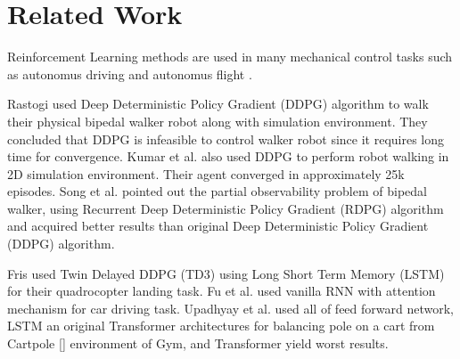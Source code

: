 \section{Related Work}
\label{sec:relatedwork}

Reinforcement Learning methods are used in many mechanical control tasks such as autonomus driving  \cite{pan_virtual_2017} \cite{shalev-shwartz_safe_2016} \cite{sallab_deep_2017} \cite{wang_deep_2019} and autonomus flight   \cite{kopsa_reinforcement_2018} \cite{abbeel_application_2006} \cite{santos_experimental_2012}.

Rastogi \cite{rastogi_deep_2017} used Deep Deterministic Policy Gradient (DDPG) algorithm to walk their physical bipedal walker robot along with simulation environment. They concluded that DDPG is infeasible to control walker robot since it requires long time for convergence. Kumar et al. \cite{kumar_bipedal_2018} also used DDPG to perform robot walking in 2D simulation environment. Their agent converged in approximately 25k episodes. Song et al. \cite{song_recurrent_2018} pointed out the partial observability problem of bipedal walker, using Recurrent Deep Deterministic Policy Gradient (RDPG) \cite{heess_memory-based_2015} algorithm and acquired better results than original Deep Deterministic Policy Gradient (DDPG) algorithm. 

Fris \cite{fris_landing_2020} used Twin Delayed DDPG (TD3) using Long Short Term Memory (LSTM) for their quadrocopter landing task. Fu et al. \cite{fu_when_2020} used vanilla RNN with attention mechanism for car driving task. Upadhyay et al. \cite{upadhyay_transformer_2019} used all of feed forward network, LSTM an original Transformer architectures for balancing pole on a cart from Cartpole [] environment of Gym, and Transformer yield worst results.